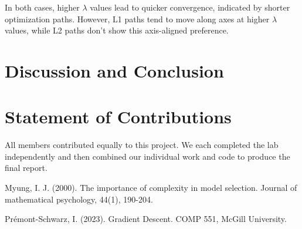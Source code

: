 \documentclass{article}
\begin{document}
In both cases, higher $\lambda$ values lead to quicker convergence, indicated by shorter optimization paths. However, L1 paths tend to move along axes at higher $\lambda$ values, while L2 paths don't show this axis-aligned preference.

\section{Discussion and Conclusion}



\section{Statement of Contributions}

All members contributed equally to this project. We each completed the lab independently and then combined our individual work and code to produce the final report.

\newpage
  

\begin{thebibliography}{1}

 Myung, I. J. (2000). The importance of complexity in model selection. Journal of mathematical psychology, 44(1), 190-204.
\label{model_complexity}

 Prémont-Schwarz, I. (2023). Gradient Descent. COMP 551, McGill University.\label{ref:lectures}


\end{thebibliography}
\end{document}
